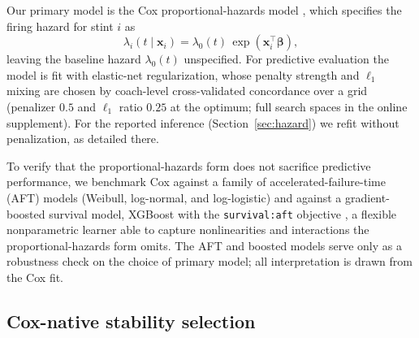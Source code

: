 \documentclass[12pt,USenglish]{article}
\begin{document}
Our primary model is the Cox proportional-hazards model \citep{cox1972}, which specifies the firing hazard for stint $i$ as
\begin{equation}
\lambda_i(t \mid \mathbf{x}_i) = \lambda_0(t)\,\exp(\mathbf{x}_i^\top \boldsymbol{\beta}),
\label{eq:cox}
\end{equation}
leaving the baseline hazard $\lambda_0(t)$ unspecified. For predictive evaluation the model is fit with elastic-net regularization, whose penalty strength and $\ell_1$ mixing are chosen by coach-level cross-validated concordance over a grid (penalizer $0.5$ and $\ell_1$ ratio $0.25$ at the optimum; full search spaces in the online supplement). For the reported inference (Section~\ref{sec:hazard}) we refit without penalization, as detailed there.

To verify that the proportional-hazards form does not sacrifice predictive performance, we benchmark Cox against a family of accelerated-failure-time (AFT) models (Weibull, log-normal, and log-logistic) and against a gradient-boosted survival model, XGBoost with the \texttt{survival:aft} objective \citep{chen2016}, a flexible nonparametric learner able to capture nonlinearities and interactions the proportional-hazards form omits. The AFT and boosted models serve only as a robustness check on the choice of primary model; all interpretation is drawn from the Cox fit.

\subsection{Cox-native stability selection}
\label{sec:selection}
\end{document}
